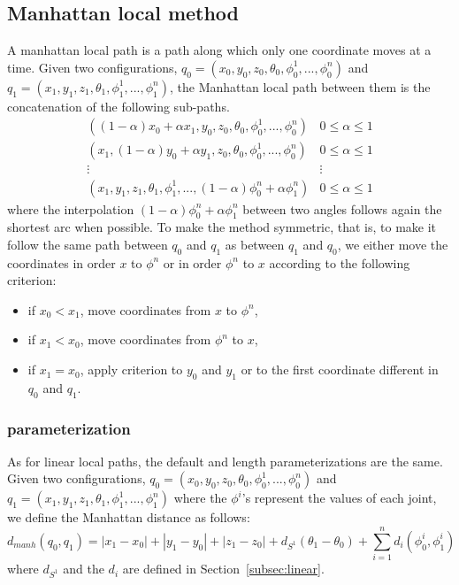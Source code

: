 \subsection{Manhattan local method}

A manhattan local path is a path along which only one coordinate moves
at a time. 
Given two configurations, $q_0=(x_0,y_0,z_0,\theta_0,
\phi^{1}_{0},...,\phi^{n}_{0})$ and
$q_1=(x_1,y_1,z_1,\theta_1,\phi^{1}_{1},...,\phi^{n}_{1})$, the
Manhattan local path between them is the concatenation of the
following sub-paths.
\[
\begin{array}{cc}
((1-\alpha)x_0+\alpha x_1,y_0,z_0,\theta_0,\phi^{1}_{0},...,\phi^{n}_{0}) &
0 \leq \alpha \leq 1 \\
(x_1,(1-\alpha)y_0+\alpha y_1,z_0,\theta_0,\phi^{1}_{0},...,\phi^{n}_{0}) &
0 \leq \alpha \leq 1 \\
\vdots & \vdots \\
(x_1,y_1,z_1,\theta_1,\phi^{1}_{1},..., (1-\alpha)\phi^{n}_{0}+\alpha\phi^{n}_{1})& 0 \leq \alpha \leq 1
\end{array}
\]
where the interpolation $(1-\alpha)\phi^{n}_{0}+\alpha\phi^{n}_{1}$
between two angles follows again the shortest arc when possible.
To make the method symmetric, that is, to make it follow the same path
between $q_0$ and $q_1$ as between $q_1$ and $q_0$, we either move the
coordinates in order $x$ to $\phi^{n}$ or in order $\phi^{n}$ to $x$
according to the following criterion:
\begin{itemize}
\item if $x_0<x_1$, move coordinates from $x$ to $\phi^{n}$,
\item if $x_1<x_0$, move coordinates from $\phi^{n}$ to $x$,
\item if $x_1=x_0$, apply criterion to $y_0$ and $y_1$ or to the
  first coordinate different in $q_0$ and $q_1$.
\end{itemize}

\subsubsection*{parameterization}

As for linear local paths, the default and length parameterizations
are the same. Given two configurations, $q_0=(x_0,y_0,z_0,\theta_0,
\phi^{1}_{0},...,\phi^{n}_{0})$ and $q_1=(x_1,y_1,z_1,\theta_1,
\phi^{1}_{1},...,\phi^{n}_{1})$ where the $\phi^i$'s represent the values 
of each joint, we define the Manhattan distance as follows:
$$
d_{manh}(q_0,q_1) = |x_1-x_0| + |y_1-y_0| + |z_1-z_0| + d_{S^1}(\theta_1-\theta_0) + \sum_{i=1}^{n} d_i(\phi^i_0,\phi^i_1)
$$
where $d_{S^1}$ and the $d_i$ are defined in Section~\ref{subsec:linear}.

